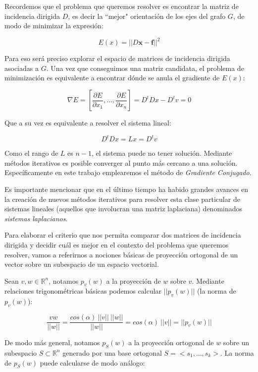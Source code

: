 \documentclass[10pt, a4paper, twocolumn]{article} %
\begin{document}
\bigskip


Recordemos que el problema que queremos resolver es encontrar la matriz 
de incidencia dirigida $D$, es decir la ``mejor" orientación de los ejes 
del grafo $G$, de modo de minimizar la expresión:

$$E(x) = ||D\bm{x}-\bm{f}||^2$$

Para eso será preciso explorar el espacio de matrices de 
incidencia dirigida asociadas a $G$. Una vez que conseguimos una 
matriz candidata, el problema de minimización es equivalente a encontrar
dónde se anula el gradiente de $E(x)$:
 
$$\nabla E = [\frac{\partial E}{\partial x_1}, \dots, \frac{\partial 
E}{\partial x_n}] = D^tDx-D^tv=0$$

Que a su vez es equivalente a resolver el sistema lineal:

$$D^tDx = Lx = D^tv$$

Como el rango de $L$ es $n-1$, el sistema puede no tener solución. 
Mediante métodos iterativos es posible converger al punto más cercano a 
una solución. Específicamente en este trabajo emplearemos el método de 
\textit{Gradiente Conjugado}.

\smallskip

Es importante mencionar que en el último 
tiempo ha habido grandes avances en la creación de nuevos métodos 
iterativos para resolver esta clase particular de sistemas lineales 
(aquellos que involucran una matriz laplaciana) denominados 
\textit{sistemas laplacianos}.

\bigskip


Para elaborar el criterio que nos permita comparar dos matrices de 
incidencia dirigida y decidir cuál es mejor en el contexto del problema 
que queremos resolver, vamos a referirnos a nociones básicas de 
proyección ortogonal de un vector sobre un subespacio de un espacio 
vectorial.

\smallskip

Sean $v,w \in \mathbb{R}^n$, notamos $p_v(w)$ a la proyección de $w$ 
sobre $v$. Mediante relaciones trigonométricas básicas podemos 
calcular $||p_v(w)||$ (la norma de $p_v(w)$):

$$\frac{v w}{||w||} = \frac{cos(\alpha) \ ||v|| \ ||w||}{||w||} = 
cos(\alpha) \ ||v|| = ||p_v(w)||$$

De modo más general, notamos $p_S(w)$ a la proyección ortogonal de $w$
sobre un subespacio $S \subset \mathbb{R}^n$ generado por una base 
ortogonal $S = <s_1, \dots, s_k>$. La norma de $p_S(w)$ puede calcularse
de modo análogo:
\end{document}
